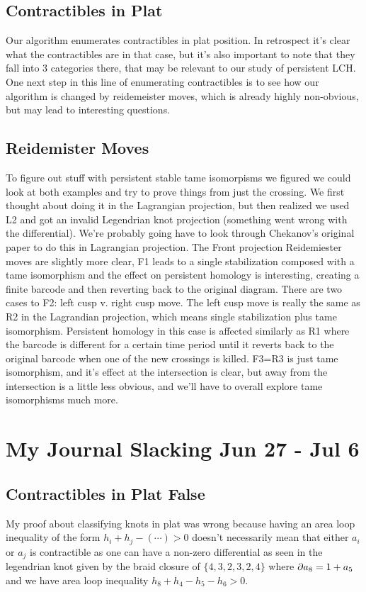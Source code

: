 \documentclass[11pt,oneside]{amsart}
\begin{document}
\subsection{Contractibles in Plat} Our algorithm enumerates contractibles in plat position. In retrospect it's clear what the contractibles are in that case, but it's also important to note that they fall into 3 categories there, that may be relevant to our study of persistent LCH. One next step in this line of enumerating contractibles is to see how our algorithm is changed by reidemeister moves, which is already highly non-obvious, but may lead to interesting questions.

\subsection{Reidemister Moves} To figure out stuff with persistent stable tame isomorpisms we figured we could look at both examples and try to prove things from just the crossing. We first thought about doing it in the Lagrangian projection, but then realized we used L2 and got an invalid Legendrian knot projection (something went wrong with the differential). We're probably going have to look through Chekanov's original paper to do this in Lagrangian projection. The Front projection Reidemiester moves are slightly more clear, F1 leads to a single stabilization composed with a tame isomorphism and the effect on persistent homology is interesting, creating a finite barcode and then reverting back to the original diagram. There are two cases to F2: left cusp v. right cusp move. The left cusp move is really the same as R2 in the Lagrandian projection, which means single stabilization plus tame isomorphism. Persistent homology in this case is affected similarly as R1 where the barcode is different for a certain time period until it reverts back to the original barcode when one of the new crossings is killed. F3=R3 is just tame isomorphism, and it's effect at the intersection is clear, but away from the intersection is a little less obvious, and we'll have to overall explore tame isomorphisms much more.

\section{My Journal Slacking Jun 27 - Jul 6}

\subsection{Contractibles in Plat False} My proof about classifying knots in plat was wrong because having an area loop inequality of the form $h_i + h_j - (\cdots)>0$ doesn't necessarily mean that either $a_i$ or $a_j$ is contractible as one can have a non-zero differential as seen in the legendrian knot given by the braid closure of $\{4, 3, 2, 3, 2, 4\}$ where $\partial a_8 = 1+a_5$ and we have area loop inequality $h_8+h_4-h_5-h_6>0$.
\end{document}

